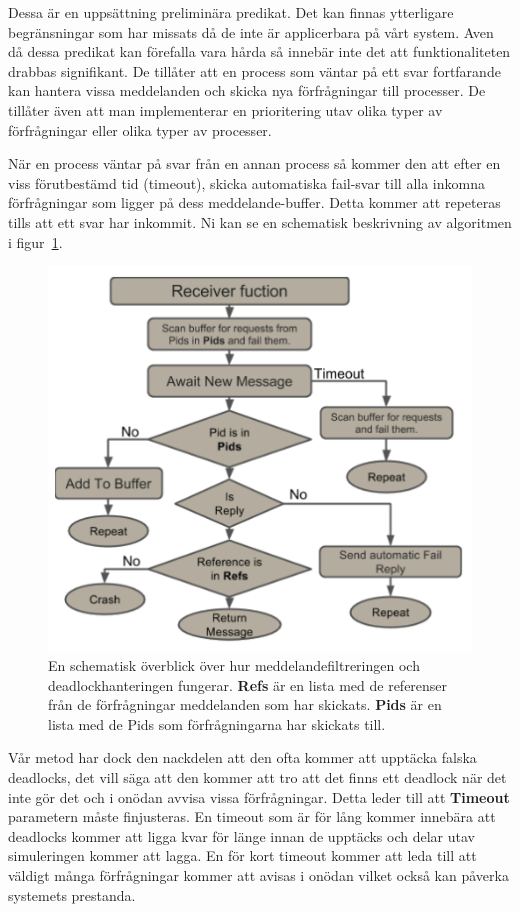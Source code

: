 \documentclass[12pt]{article}
\begin{document}
Dessa är en uppsättning preliminära predikat.
Det kan finnas ytterligare begränsningar som har missats då de inte är applicerbara på vårt system.
Aven då dessa predikat
kan förefalla vara hårda så innebär inte det att funktionaliteten drabbas signifikant.
De tillåter att en process som väntar på ett svar fortfarande kan hantera vissa meddelanden och skicka nya förfrågningar till processer.
De tillåter även att man implementerar en prioritering utav olika typer av förfrågningar eller olika typer av processer.

När en process väntar på svar från en annan process så kommer den att efter en viss förutbestämd tid (timeout),
skicka automatiska fail-svar till alla inkomna förfrågningar som ligger på dess meddelande-buffer.
Detta kommer att repeteras tills att ett svar har inkommit.
Ni kan se en schematisk beskrivning av algoritmen i figur~\ref{fig:deadlock}.

\begin{figure}
    \centering
    \includegraphics[width=\textwidth]{BugsLife-Fig4.png}
    \caption{En schematisk överblick över hur meddelandefiltreringen och deadlockhanteringen fungerar.
\textbf{Refs} är en lista med de referenser från de förfrågningar meddelanden som har skickats.
\textbf{Pids} är en lista med de Pids som förfrågningarna har skickats till.}
    \label{fig:deadlock}
\end{figure}

Vår metod har dock den nackdelen att den ofta kommer att upptäcka falska deadlocks,
det vill säga att den kommer att tro att det finns ett deadlock när det inte gör det och i onödan avvisa vissa förfrågningar.
Detta leder till att \textbf{Timeout} parametern måste finjusteras.
En timeout som är för lång kommer innebära att deadlocks kommer att ligga kvar för länge innan de upptäcks och delar utav simuleringen kommer att lagga.
En för kort timeout kommer att leda till att väldigt många förfrågningar kommer att avisas i onödan vilket också kan påverka systemets prestanda.
\end{document}
